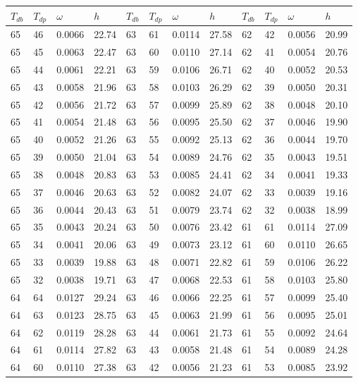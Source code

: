 \begin{tabular}{llll|llll|llll}
 \toprule 
\(T_{db}\) & \(T_{dp}\) & \(\omega\) & \(h\) & \(T_{db}\) & \(T_{dp}\) & \(\omega\) & \(h\) & \(T_{db}\) & \(T_{dp}\) & \(\omega\) & \(h\)  \\ \midrule 
65 & 46 & 0.0066 & 22.74 & 63 & 61 & 0.0114 & 27.58 & 62 & 42 & 0.0056 & 20.99\\
65 & 45 & 0.0063 & 22.47 & 63 & 60 & 0.0110 & 27.14 & 62 & 41 & 0.0054 & 20.76\\
65 & 44 & 0.0061 & 22.21 & 63 & 59 & 0.0106 & 26.71 & 62 & 40 & 0.0052 & 20.53\\
65 & 43 & 0.0058 & 21.96 & 63 & 58 & 0.0103 & 26.29 & 62 & 39 & 0.0050 & 20.31\\
65 & 42 & 0.0056 & 21.72 & 63 & 57 & 0.0099 & 25.89 & 62 & 38 & 0.0048 & 20.10\\
65 & 41 & 0.0054 & 21.48 & 63 & 56 & 0.0095 & 25.50 & 62 & 37 & 0.0046 & 19.90\\
65 & 40 & 0.0052 & 21.26 & 63 & 55 & 0.0092 & 25.13 & 62 & 36 & 0.0044 & 19.70\\
65 & 39 & 0.0050 & 21.04 & 63 & 54 & 0.0089 & 24.76 & 62 & 35 & 0.0043 & 19.51\\
65 & 38 & 0.0048 & 20.83 & 63 & 53 & 0.0085 & 24.41 & 62 & 34 & 0.0041 & 19.33\\
65 & 37 & 0.0046 & 20.63 & 63 & 52 & 0.0082 & 24.07 & 62 & 33 & 0.0039 & 19.16\\
65 & 36 & 0.0044 & 20.43 & 63 & 51 & 0.0079 & 23.74 & 62 & 32 & 0.0038 & 18.99\\
65 & 35 & 0.0043 & 20.24 & 63 & 50 & 0.0076 & 23.42 & 61 & 61 & 0.0114 & 27.09\\
65 & 34 & 0.0041 & 20.06 & 63 & 49 & 0.0073 & 23.12 & 61 & 60 & 0.0110 & 26.65\\
65 & 33 & 0.0039 & 19.88 & 63 & 48 & 0.0071 & 22.82 & 61 & 59 & 0.0106 & 26.22\\
65 & 32 & 0.0038 & 19.71 & 63 & 47 & 0.0068 & 22.53 & 61 & 58 & 0.0103 & 25.80\\
64 & 64 & 0.0127 & 29.24 & 63 & 46 & 0.0066 & 22.25 & 61 & 57 & 0.0099 & 25.40\\
64 & 63 & 0.0123 & 28.75 & 63 & 45 & 0.0063 & 21.99 & 61 & 56 & 0.0095 & 25.01\\
64 & 62 & 0.0119 & 28.28 & 63 & 44 & 0.0061 & 21.73 & 61 & 55 & 0.0092 & 24.64\\
64 & 61 & 0.0114 & 27.82 & 63 & 43 & 0.0058 & 21.48 & 61 & 54 & 0.0089 & 24.28\\
64 & 60 & 0.0110 & 27.38 & 63 & 42 & 0.0056 & 21.23 & 61 & 53 & 0.0085 & 23.92\\

\end{tabular}
